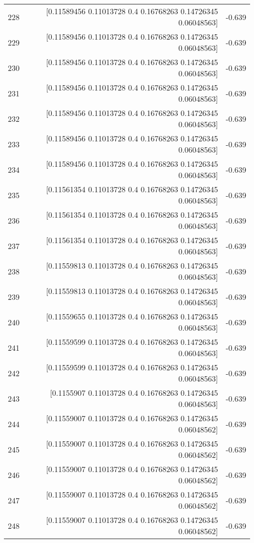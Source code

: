 \begin{longtable}{lrr}
228 & [0.11589456 0.11013728 0.4        0.16768263 0.14726345 0.06048563] & -0.639 \\
229 & [0.11589456 0.11013728 0.4        0.16768263 0.14726345 0.06048563] & -0.639 \\
230 & [0.11589456 0.11013728 0.4        0.16768263 0.14726345 0.06048563] & -0.639 \\
231 & [0.11589456 0.11013728 0.4        0.16768263 0.14726345 0.06048563] & -0.639 \\
232 & [0.11589456 0.11013728 0.4        0.16768263 0.14726345 0.06048563] & -0.639 \\
233 & [0.11589456 0.11013728 0.4        0.16768263 0.14726345 0.06048563] & -0.639 \\
234 & [0.11589456 0.11013728 0.4        0.16768263 0.14726345 0.06048563] & -0.639 \\
235 & [0.11561354 0.11013728 0.4        0.16768263 0.14726345 0.06048563] & -0.639 \\
236 & [0.11561354 0.11013728 0.4        0.16768263 0.14726345 0.06048563] & -0.639 \\
237 & [0.11561354 0.11013728 0.4        0.16768263 0.14726345 0.06048563] & -0.639 \\
238 & [0.11559813 0.11013728 0.4        0.16768263 0.14726345 0.06048563] & -0.639 \\
239 & [0.11559813 0.11013728 0.4        0.16768263 0.14726345 0.06048563] & -0.639 \\
240 & [0.11559655 0.11013728 0.4        0.16768263 0.14726345 0.06048563] & -0.639 \\
241 & [0.11559599 0.11013728 0.4        0.16768263 0.14726345 0.06048563] & -0.639 \\
242 & [0.11559599 0.11013728 0.4        0.16768263 0.14726345 0.06048563] & -0.639 \\
243 & [0.1155907  0.11013728 0.4        0.16768263 0.14726345 0.06048563] & -0.639 \\
244 & [0.11559007 0.11013728 0.4        0.16768263 0.14726345 0.06048562] & -0.639 \\
245 & [0.11559007 0.11013728 0.4        0.16768263 0.14726345 0.06048562] & -0.639 \\
246 & [0.11559007 0.11013728 0.4        0.16768263 0.14726345 0.06048562] & -0.639 \\
247 & [0.11559007 0.11013728 0.4        0.16768263 0.14726345 0.06048562] & -0.639 \\
248 & [0.11559007 0.11013728 0.4        0.16768263 0.14726345 0.06048562] & -0.639 \\

\end{longtable}
